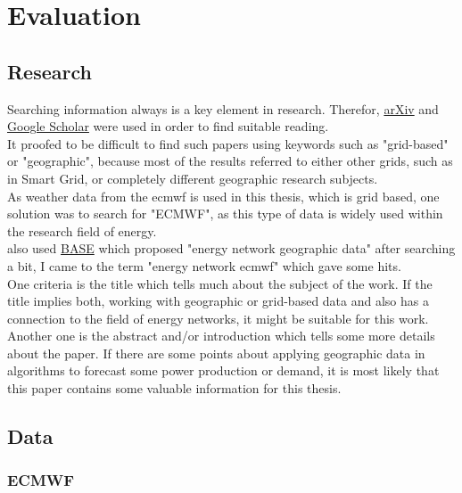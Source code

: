 \chapter{Evaluation}
\label{ch:Evaluation}

\section{Research}

Searching information always is a key element in research. Therefor, \href{arxiv.org}{arXiv} and \href{scholar.google.de}{Google Scholar} were used in order to find suitable reading.\\
It proofed to be difficult to find such papers using keywords such as "grid-based" or "geographic", because most of the results referred to either other grids, such as in Smart Grid, or completely different geographic research subjects.\\
As weather data from the \acrshort{ecmwf} is used in this thesis, which is grid based, one solution was to search for "ECMWF", as this type of data is widely used within the research field of energy.\\

also used \href{base-search.net}{BASE} which proposed "energy network geographic data" after searching a bit, I came to the term "energy network ecmwf" which gave some hits.\\
One criteria is the title which tells much about the subject of the work. If the title implies both, working with geographic or grid-based data and also has a connection to the field of energy networks, it might be suitable for this work.\\
Another one is the abstract and/or introduction which tells some more details about the paper. If there are some points about applying geographic data in algorithms to forecast some power production or demand, it is most likely that this paper contains some valuable information for this thesis.\\

\section{Data}

\subsection{ECMWF}

